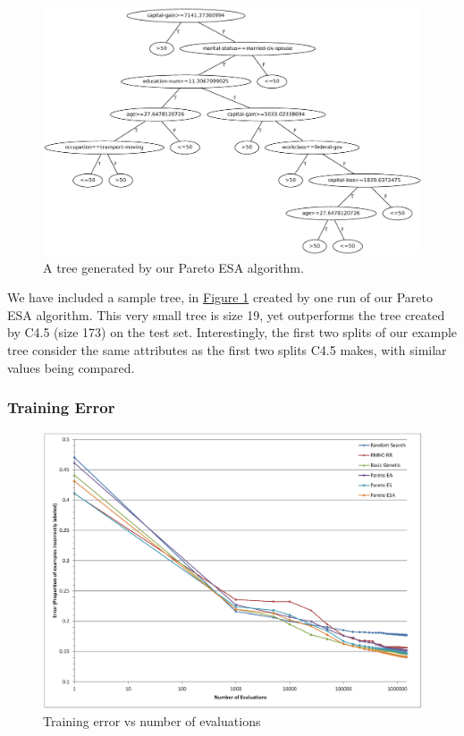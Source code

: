 \documentclass{acm_proc_article-sp}
\begin{document}
\begin{figure}[h]
\centering
\includegraphics[width=\linewidth]{tree.eps}
\caption{A tree generated by our Pareto ESA algorithm.}\label{tree}
\end{figure}

We have included a sample tree, in \hyperref[tree]{Figure 1} created by one run of our Pareto ESA algorithm. This very small tree is size 19, yet outperforms the tree created by C4.5 (size 173) on the test set. Interestingly, the first two splits of our example tree consider the same attributes as the first two splits C4.5 makes, with similar values being compared.

\subsubsection{Training Error}

\begin{figure}[h]
\centering
\includegraphics[width=\linewidth]{train_chart.eps}
\caption{Training error vs number of evaluations}\label{train}
\end{figure}
\end{document}
